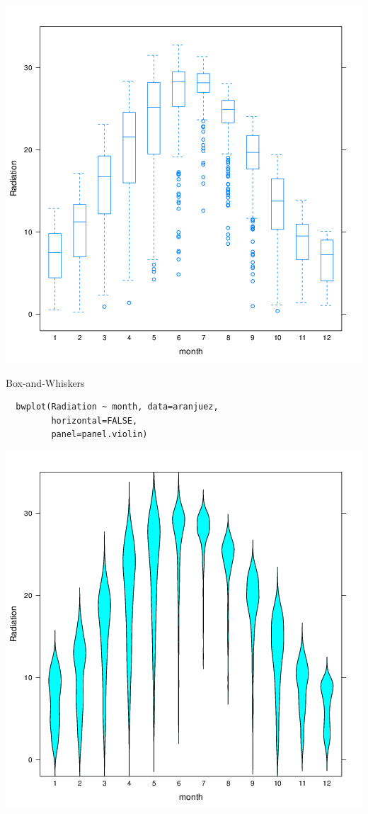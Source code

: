 \documentclass[xcolor={usenames,svgnames,dvipsnames}]{beamer}
\begin{document}
\begin{frame}[label={sec:orgheadline48}]{}
\includegraphics[width=.9\linewidth]{figs/bwplot.png}
\end{frame}

\begin{frame}[fragile,label={sec:orgheadline49}]{Box-and-Whiskers}
 \lstset{language=R,label= ,caption= ,captionpos=b,numbers=none}
\begin{lstlisting}
  bwplot(Radiation ~ month, data=aranjuez,
         horizontal=FALSE,
         panel=panel.violin)
\end{lstlisting}
\end{frame}

\begin{frame}[label={sec:orgheadline50}]{}
\includegraphics[width=.9\linewidth]{figs/violin.png}
\end{frame}
\end{document}
